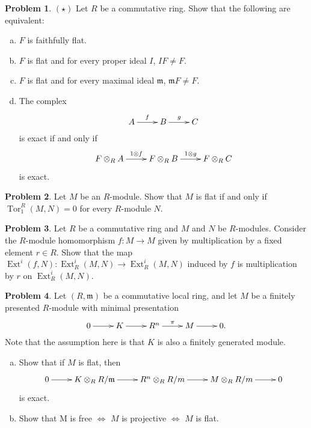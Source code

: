 \documentclass[11pt]{article}
\DeclareMathOperator{\Tor}{Tor}
\DeclareMathOperator{\Ext}{Ext}
\newcommand{\m}{\mathfrak{m}}
\theoremstyle{definition}
\newtheorem{problem}{Problem}
\begin{document}
\vspace{2em}

\noindent
{} 

\vspace{0.5em}

\begin{problem} 
$(\star)$ Let $R$ be a commutative ring.
Show that the following are equivalent:	
\begin{enumerate}[a)]
		\item $F$ is faithfully flat.
		\item $F$ is flat and for every proper ideal $I$, $IF \neq F$.
		\item $F$ is flat and for every maximal ideal $\m$, $\m F \neq F$.
		\item The complex
		$$\xymatrix{A \ar[r]^-f & B \ar[r]^-g & C}$$
		is exact if and only if 
		$$\xymatrix{F \otimes_R A \ar[r]^-{1 \otimes f} & F \otimes_R B \ar[r]^-{1 \otimes g} & F \otimes_R C}$$ 
		is exact.
	\end{enumerate}
\end{problem}


\vfill



\begin{problem}
Let $M$ be an $R$-module. Show that $M$ is flat if and only if $\Tor_1^R(M,N) = 0$ for every $R$-module $N$.
\end{problem}



\vfill
	
\begin{problem}
Let $R$ be a commutative ring and $M$ and $N$ be $R$-modules. Consider the $R$-module homomorphism $f\!: M \to M$ given by multiplication by a fixed element $r \in R$. Show that the map $\Ext^i(f,N)\!: \Ext^i_R(M,N) \to \Ext^i_R(M,N)$ induced by $f$ is multiplication by $r$ on $\Ext^i_R(M,N)$.
\end{problem}




\vfill


\newpage

\begin{problem}
Let $(R, \m)$ be a commutative local ring, and let $M$ be a finitely presented $R$-module with minimal presentation
$$\xymatrix{0 \ar[r] & K \ar[r] & R^n \ar[r]^-\pi & M \ar[r] & 0.}$$
Note that the assumption here is that $K$ is also a finitely generated module.
\begin{enumerate}[a)]
	\item Show that if $M$ is flat, then
$$\xymatrix{0 \ar[r] & K \otimes_R R/\m \ar[r] & R^n \otimes_R R/m \ar[r] & M \otimes_R R/m \ar[r] & 0}$$
is exact.
\item Show that 
	  M is free $\iff$ $M$ is projective $\iff$ $M$ is flat.
\end{enumerate}
\end{problem}
\end{document}
